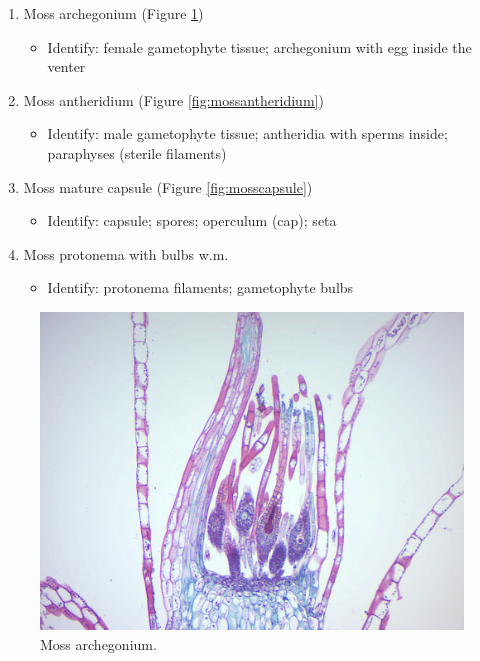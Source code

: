 \begin{enumerate}
\def\labelenumi{\arabic{enumi}.}
\tightlist
\item
  Moss archegonium (Figure \ref{fig:mossarchegonium})

  \begin{itemize}
  \tightlist
  \item
    Identify: female gametophyte tissue; archegonium with egg inside the
    venter
  \end{itemize}
\item
  Moss antheridium (Figure \ref{fig:mossantheridium})

  \begin{itemize}
  \tightlist
  \item
    Identify: male gametophyte tissue; antheridia with sperms inside;
    paraphyses (sterile filaments)
  \end{itemize}
\item
  Moss mature capsule (Figure \ref{fig:mosscapsule})

  \begin{itemize}
  \tightlist
  \item
    Identify: capsule; spores; operculum (cap); seta
  \end{itemize}
\item
  Moss protonema with bulbs w.m.

  \begin{itemize}
  \tightlist
  \item
    Identify: protonema filaments; gametophyte bulbs
  \end{itemize}
\end{enumerate}

\begin{figure}

{\centering \includegraphics[width=0.7\linewidth]{./figures/mosses/moss_archegonium}

}

\caption{Moss archegonium.}\label{fig:mossarchegonium}
\end{figure}

